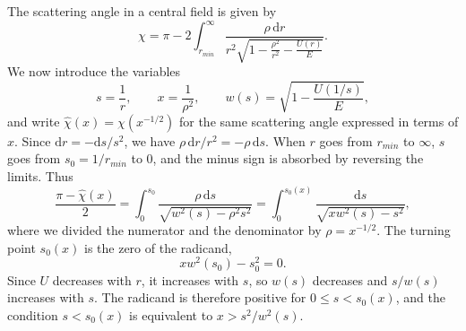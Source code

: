 \begin{problem}[title={Repulsive field from cross-section (Firsov)}]
{The scattering angle in a central field is given by
\begin{equation*}
    \chi = \pi - 2\int_{r_{min}}^\infty \frac{\rho\,\mathrm{d}r}{r^2\sqrt{1 - \frac{\rho^2}{r^2} - \frac{U(r)}{E}}}.
\end{equation*}
We now introduce the variables
\begin{equation*}
    s = \frac{1}{r}, \qquad x = \frac{1}{\rho^2}, \qquad w(s) = \sqrt{1 - \frac{U(1/s)}{E}},
\end{equation*}
and write $\widehat{\chi}(x) = \chi(x^{-1/2})$ for the same scattering angle expressed in terms of $x$. Since $\mathrm{d}r = -\mathrm{d}s/s^2$, we have $\rho\,\mathrm{d}r/r^2 = -\rho\,\mathrm{d}s$. When $r$ goes from $r_{min}$ to $\infty$, $s$ goes from $s_0 = 1/r_{min}$ to $0$, and the minus sign is absorbed by reversing the limits. Thus
\begin{equation*}
    \frac{\pi - \widehat{\chi}(x)}{2} = \int_0^{s_0} \frac{\rho\,\mathrm{d}s}{\sqrt{w^2(s) - \rho^2s^2}} = \int_0^{s_0(x)} \frac{\mathrm{d}s}{\sqrt{xw^2(s) - s^2}},
\end{equation*}
where we divided the numerator and the denominator by $\rho = x^{-1/2}$. The turning point $s_0(x)$ is the zero of the radicand,
\begin{equation*}
    xw^2(s_0) - s_0^2 = 0.
\end{equation*}
Since $U$ decreases with $r$, it increases with $s$, so $w(s)$ decreases and $s/w(s)$ increases with $s$. The radicand is therefore positive for $0 \leq s < s_0(x)$, and the condition $s < s_0(x)$ is equivalent to $x > s^2/w^2(s)$.

}
\end{problem}
